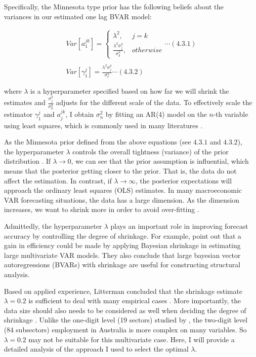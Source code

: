 \documentclass{monashthesis}
\begin{document}
Specifically, the Minnesota type prior has the following beliefs about the variances in our estimated one lag BVAR model:

\[
\begin{aligned}
&Var[a_1^{jk}]= 
\begin{cases}
\lambda^2,&j=k\\
\frac{\lambda^2\sigma^2_{j}}{\sigma^2_k},& otherwise
\end{cases}\cdots(4.3.1)\\
\\
&Var[\gamma_1^{j}]=\frac{\lambda^2\sigma^2_{j}}{\sigma^2_e}\cdots(4.3.2)
\end{aligned}
\]

where \(\lambda\) is a hyperparameter specified based on how far we will shrink the estimates and \(\frac{\sigma^2_{j}}{\sigma^2_k}\) adjusts for the different scale of the data. To effectively scale the estimator \(\gamma^j_1\) and \(a_j^{jk}\), I obtain \(\sigma_n^2\) by fitting an AR(4) model on the \(n\)-th variable using least squares, which is commonly used in many literatures \autocite{anderson2020,banbura2010large,koop2013}.

As the Minnesota prior defined from the above equations (see \(4.3.1\) and \(4.3.2\)), the hyperparameter \(\lambda\) controls the overall tightness (variance) of the prior distribution \autocite{banbura2010large}. If \(\lambda\rightarrow0\), we can see that the prior assumption is influential, which means that the posterior getting closer to the prior. That is, the data do not affect the estimation. In contrast, if \(\lambda\rightarrow\infty\), the posterior expectations will approach the ordinary least squares (OLS) estimates. In many macroeconomic VAR forecasting situations, the data has a large dimension. As the dimension increases, we want to shrink more in order to avoid over-fitting \autocite{de2008}.

Admittedly, the hyperparameter \(\lambda\) plays an important role in improving forecast accuracy by controlling the degree of shrinkage. For example, \textcite{banbura2010large} point out that a gain in efficiency could be made by applying Bayesian shrinkage in estimating large multivariate VAR models. They also conclude that large bayesian vector autoregressions (BVARs) with shrinkage are useful for constructing structural analysis.

Based on applied experience, Litterman concluded that the shrinkage estimate \(\lambda=0.2\) is sufficient to deal with many empirical cases \autocite{litterman1986}. More importantly, the data size should also needs to be considered as well when deciding the degree of shrinkage \autocite{banbura2010large}. Unlike the one-digit level (19 sectors) studied by \textcite{anderson2020}, the two-digit level (84 subsectors) employment in Australia is more complex on many variables. So \(\lambda=0.2\) may not be suitable for this multivariate case. Here, I will provide a detailed analysis of the approach I used to select the optimal \(\lambda\).
\end{document}
